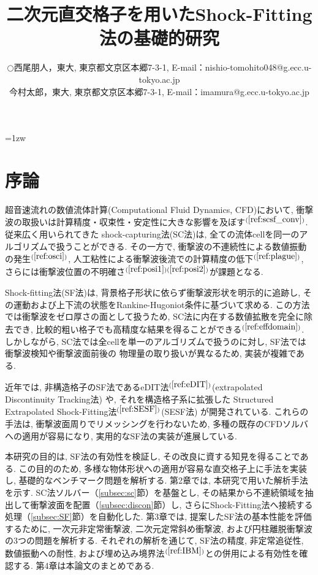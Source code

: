 \documentclass[a4j]{jarticle}
\title{二次元直交格子を用いたShock-Fitting法の基礎的研究}   %
\author{\begin{tabular}{cl}
$\bigcirc$ & 西尾朋人，東大, 
             東京都文京区本郷7-3-1, 
             E-mail：nishio-tomohito048@g.ecc.u-tokyo.ac.jp \\
           & 今村太郎，東大,
             東京都文京区本郷7-3-1, 
             E-mail：imamura@g.ecc.u-tokyo.ac.jp
\end{tabular} }
\begin{document}
\baselineskip=1zw
\maketitle

\setlength{\baselineskip}{1.32\baselineskip}
\section{序論} \label{sec:intro}

超音速流れの数値流体計算(Computational Fluid Dynamics, CFD)において, 衝撃波の取扱いは計算精度・収束性・安定性に大きな影響を及ぼす$^{(\ref{ref:scsf_conv})}$.
従来広く用いられてきた shock-capturing法(SC法)は, 全ての流体cellを同一のアルゴリズムで扱うことができる. 
その一方で, 衝撃波の不連続性による数値振動の発生$^{(\ref{ref:osci})}$,
人工粘性による衝撃波後流での計算精度の低下$^{(\ref{ref:plague})}$, さらには衝撃波位置の不明確さ$^{(\ref{ref:posi1})(\ref{ref:posi2})}$が課題となる.

Shock-fitting法(SF法)は, 背景格子形状に依らず衝撃波形状を明示的に追跡し, 
その運動および上下流の状態をRankine-Hugoniot条件に基づいて求める.
この方法では衝撃波をゼロ厚さの面として扱うため, SC法に内在する数値拡散を完全に除去でき, 
比較的粗い格子でも高精度な結果を得ることができる$^{(\ref{ref:effdomain})}$. 
しかしながら, SC法では全cellを単一のアルゴリズムで扱うのに対し, SF法では衝撃波検知や衝撃波面前後の
物理量の取り扱いが異なるため, 実装が複雑である.

近年では, 非構造格子のSF法であるeDIT法$^{(\ref{ref:eDIT})}$(extrapolated Discontinuity Tracking法) や, 
それを構造格子系に拡張した Structured Extrapolated Shock-Fitting法$^{(\ref{ref:SESF})}$(SESF法) が開発されている.
これらの手法は, 衝撃波面周りでリメッシングを行わないため,  
多種の既存のCFDソルバへの適用が容易になり, 実用的なSF法の実装が進展している.

本研究の目的は, SF法の有効性を検証し, その改良に資する知見を得ることである.
この目的のため, 多様な物体形状への適用が容易な直交格子上に手法を実装し, 基礎的なベンチマーク問題を解析する.
第2章では, 本研究で用いた解析手法を示す.
SC法ソルバー（\ref{subsec:sc}節）を基盤とし, その結果から不連続領域を抽出して衝撃波面を配置（\ref{subsec:discon}節）し, 
さらにShock-Fitting法へ接続する処理（\ref{subsec:SF}節）を自動化した.
第3章では, 提案したSF法の基本性能を評価するために, 一次元非定常衝撃波, 二次元定常斜め衝撃波, および円柱離脱衝撃波の3つの問題を解析する.
それぞれの解析を通じて, SF法の精度, 非定常追従性, 数値振動への耐性, および埋め込み境界法$^{(\ref{ref:IBM})}$との併用による有効性を確認する.
第4章は本論文のまとめである.
\end{document}
